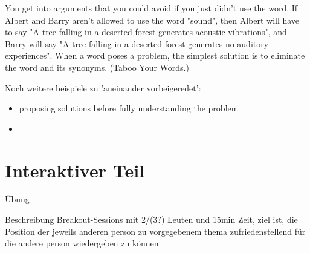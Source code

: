 \begin{frame}[c]
    You get into arguments that you could avoid if you just didn't use the word. If Albert and Barry aren't allowed to use the word "sound", then Albert will have to say "A tree falling in a deserted forest generates acoustic vibrations", and Barry will say "A tree falling in a deserted forest generates no auditory experiences".  When a word poses a problem, the simplest solution is to eliminate the word and its synonyms.  (Taboo Your Words.)
\end{frame}


\begin{frame}[c]
    Noch weitere beispiele zu 'aneinander vorbeigeredet':
    \begin{itemize}[<+(1)->]
        \item proposing solutions before fully understanding the problem
        \item 
    \end{itemize}
\end{frame}


\section{Interaktiver Teil}


\begin{frame}[c]{Übung}
    \begin{block}{Beschreibung}
    Breakout-Sessions mit 2/(3?) Leuten und 15min Zeit, ziel ist, die Position
    der jeweils anderen person zu vorgegebenem thema zufriedenstellend für die
    andere person wiedergeben zu können.
    \end{block}
\end{frame}
